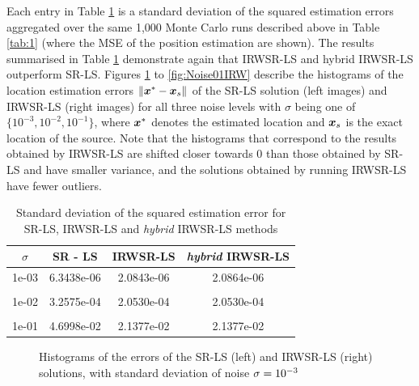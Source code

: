 Each entry in Table \ref{tab:2} is a standard deviation of the squared  estimation errors  aggregated over the  same 1,000 Monte Carlo runs described above in Table \ref{tab:1} (where the MSE of the position estimation are shown). The results summarised in Table \ref{tab:2} demonstrate again that IRWSR-LS and hybrid IRWSR-LS outperform SR-LS. Figures \ref{fig:Noise03IRW} to \ref{fig:Noise01IRW} describe the histograms of the location estimation errors $\|\mbox{\boldmath$x$}^* - \mbox{\boldmath$x$}_s\|$ of the SR-LS solution (left images) and IRWSR-LS (right images) for all three noise levels with $\sigma$ being one of $\{10^{-3}, 10^{-2}, 10^{-1}\}$, where $\mbox{\boldmath$x$}^*$ denotes the estimated location and $\mbox{\boldmath$x$}_s$ is the exact location of the source. Note that the histograms that correspond to the results obtained by IRWSR-LS are shifted closer towards $0$ than those obtained by SR-LS and have smaller variance, and the solutions obtained by running IRWSR-LS have fewer outliers.


\begin{table}[h]
\centering
\caption{Standard deviation of the squared estimation error for SR-LS, IRWSR-LS and \textit{hybrid} IRWSR-LS methods}
\phantom{m}
\begin{tabular}{|c|c|c|c|} \hline
$\sigma$ & SR - LS & IRWSR-LS & \textit{hybrid} IRWSR-LS \\ \hline
1e-03&	6.3438e-06&	2.0843e-06 & 2.0864e-06\\ &&&\\
1e-02&	3.2575e-04&	2.0530e-04 & 2.0530e-04\\ &&&\\
1e-01&	4.6998e-02&	2.1377e-02 & 2.1377e-02\\ %
\hline
\end{tabular}
\label{tab:2}
\end{table}



\begin{figure}%
\centering
\caption{Histograms of the errors of the SR-LS (left) and IRWSR-LS (right) solutions, with standard deviation of noise $\protect\sigma = 10^{-3}$}
\label{fig:Noise03IRW}
\end{figure}

